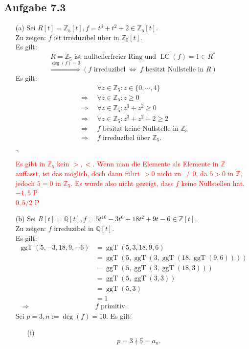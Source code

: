 \documentclass[12pt]{article}
\newcommand{\corr}[1]{\textcolor{red}{#1}}
\newcommand{\QED}{\begin{flushright} $\square$ \end{flushright}}
\newcommand{\df}{\enspace\Longrightarrow\enspace}
\newcommand{\gdw}{\;\Longleftrightarrow\;}
\newcommand{\ggT}{\operatorname{ggT}}
\newcommand{\grad}{\operatorname{deg}}
\newcommand{\LC}{\operatorname{LC}}
\begin{document}
\subsection*{Aufgabe 7.3}
\begin{enumerate}
	\item[(a)] Sei $R[t]=\mathbb{Z}_5[t], f=t^3+t^2+2\in\mathbb{Z}_5[t]$. \\
	Zu zeigen: $f$ ist irreduzibel über in $\mathbb{Z}_5[t]$. \\
	Es gilt: $$R=\mathbb{Z}_5\text{ ist nullteilerfreier Ring und }\LC(f)=1\in R^*$$
	$$\overset{\grad(f)=3}{\df} (f\text{ irreduzibel}\gdw f\text{ besitzt Nullstelle in }R)$$
	Es gilt:
	\begin{align*}
		&\forall z\in\mathbb{Z}_5:z\in\{0,\cdots,4\} \\
		\df &\forall z\in\mathbb{Z}_5:z\geq0 \\
		\df &\forall z\in\mathbb{Z}_5:z^3+z^2\geq0 \\
		\df &\forall z\in\mathbb{Z}_5:z^3+z^2+2\geq2 \\
		\df &f\text{ besitzt keine Nullstelle in }\mathbb{Z}_5 \\
		\df &f\text{ irreduzibel über }\mathbb{Z}_5.
	\end{align*}
	\QED
\corr{Es gibt in $\mathbb{Z}_5$ kein $>,<$. Wenn man die Elemente als Elemente in $\mathbb{Z}$ auffasst, ist das möglich, doch dann führt $>0$ nicht zu $\neq0$, da $5>0$ in $\mathbb{Z}$, jedoch $5=0$ in $\mathbb{Z}_5$. Es wurde also nicht gezeigt, dass $f$ keine Nullstellen hat. $-1,5$ P}\\
\corr{$0,5/2$ P}
	
	\item[(b)] Sei $R[t]=\mathbb{Q}[t], f=5t^{10}-3t^6+18t^2+9t-6\in\mathbb{Z}[t]$. \\
	Zu zeigen: $f$ irreduzibel in $\mathbb{Q}[t]$. \\
	Es gilt:
	\begin{align*}
		\ggT(5,-3,18,9,-6)&=\ggT(5,3,18,9,6) \\
		&=\ggT(5,\ggT(3,\ggT(18,\ggT(9,6)))) \\
		&=\ggT(5,\ggT(3,\ggT(18,3))) \\
		&=\ggT(5,\ggT(3,3)) \\
		&=\ggT(5,3) \\
		&=1 \\
		\df &f\text{ primitiv}.
	\end{align*}
	Sei $p=3,n:=\grad(f)=10$. Es gilt:
	\begin{enumerate}
		\item[(i)] $$p=3\nmid5=a_n.$$
		

\end{enumerate}
\end{enumerate}
\end{document}
